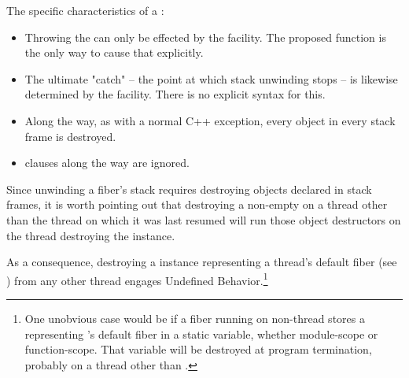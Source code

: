The specific characteristics of a \foreignex:

\begin{itemize}
    \item Throwing the \foreignex can only be effected by the \fiber
    facility. The proposed \unwindfib function is the only way to cause that
    explicitly.
    \item The ultimate "catch" -- the point at which stack unwinding stops --
    is likewise determined by the \fiber facility. There is no explicit syntax
    for this.
    \item Along the way, as with a normal C++ exception, every object in every
    stack frame is destroyed.
    \item {} clauses along the way are ignored.
\end{itemize}


Since unwinding a fiber's stack requires destroying objects declared in stack
frames,
it is worth pointing out that destroying a non-empty \fiber on a thread other
than the thread on which it was last resumed will run those object destructors
on the thread destroying the \fiber instance.

As a consequence, destroying a \fiber instance representing a thread's default
fiber (see )
from any other thread engages Undefined Behavior.\footnote{One unobvious case
would be if a fiber running on non-\main thread  stores a \fiber
representing 's default fiber in a static variable, whether
module-scope or function-scope. That variable will be destroyed at program
termination, probably on a thread other than .}

